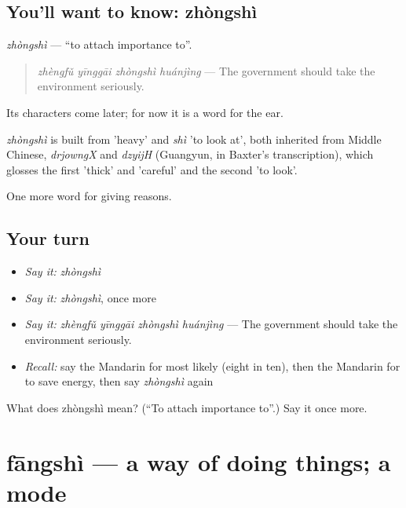 \subsection*{You'll want to know: zhòngshì}
\emph{zhòngshì} — \textquotedblleft{}to attach importance to\textquotedblright{}.

\begin{quote}
\emph{zhèngfǔ yīnggāi zhòngshì huánjìng} — The government should take the environment seriously.
\end{quote}

Its characters come later; for now it is a word for the ear.

\begin{cousinweb}
\emph{zhòngshì} is built from  'heavy' and \emph{shì} 'to look at', both inherited from Middle Chinese, \emph{drjowngX} and \emph{dzyijH} (Guangyun, in Baxter's transcription), which glosses the first 'thick' and 'careful' and the second 'to look'.
\end{cousinweb}

\begin{grammarlens}[title={What you've built}]
One more word for giving reasons.
\end{grammarlens}

\subsection*{Your turn}
\begin{itemize}
\raggedright
  \item \emph{Say it:} \emph{zhòngshì}
  \item \emph{Say it:} \emph{zhòngshì}, once more
  \item \emph{Say it:} \emph{zhèngfǔ yīnggāi zhòngshì huánjìng} — The government should take the environment seriously.
  \item \emph{Recall:} say the Mandarin for most likely (eight in ten), then the Mandarin for to save energy, then say \emph{zhòngshì} again
\end{itemize}

\begin{tcolorbox}[breakable,colback=teal!4,colframe=teal!35!black,title={Before you move on}]
What does zhòngshì mean? (\textquotedblleft{}To attach importance to\textquotedblright{}.) Say it once more.
\end{tcolorbox}
\section[fāngshì]{fāngshì — a way of doing things; a mode}

